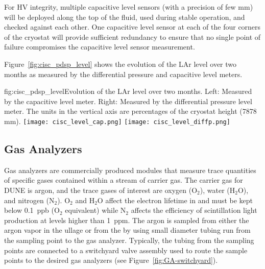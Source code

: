 For HV integrity, multiple capacitive level sensors (with a precision of few  mm) will be deployed along the top of the fluid, used during stable operation, and checked against each other.
One capacitive level sensor at each of the four corners of the cryostat will provide sufficient redundancy to ensure that no single point of failure compromises the capacitive level sensor measurement.







Figure~\ref{fig:cisc_pdsp_level} shows the evolution of the  LAr level over two months as measured by the differential pressure and capacitive level meters. 


\begin{dunefigure}{fig:cisc_pdsp_level}{Evolution of the  LAr level over two months. Left: Measured by the capacitive level meter. Right: Measured by the differential pressure level meter. The units in the vertical axis are percentages of the cryostat height (7878 mm).}
  \texttt{[image: cisc\_level\_cap.png]}%
  \hspace*{1cm}
  \texttt{[image: cisc\_level\_diffp.png]}%
\end{dunefigure}

\subsection{Gas Analyzers}
\label{sec:fdgen-slow-cryo-gas-anlyz}

 Gas analyzers are commercially produced modules that measure trace quantities of specific gases contained within a stream of carrier gas. The carrier gas for DUNE is argon, and the trace gases of interest are oxygen ($\text{O}_2$), water ($\text{H}_2\text{O}$), and nitrogen ($\text{N}_2$). $\text{O}_2$ and $\text{H}_2\text{O}$ affect the electron lifetime in  and must be kept below \SI{0.1}{ppb} ($\text{O}_2$ equivalent) while $\text{N}_2$ affects the efficiency of scintillation light production at levels higher than \SI{1}{ppm}.
The argon is sampled from either the argon vapor in the ullage or from the  by using small diameter tubing run from the sampling point to the gas analyzer. Typically, the tubing from the sampling points are connected to a switchyard valve assembly used to route the sample points to the desired gas analyzers (see Figure~\ref{fig:GA-switchyard}).


